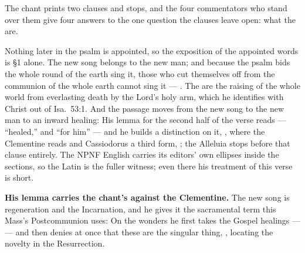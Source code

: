 The chant prints two clauses and stops, and the four commentators who stand over
them give four answers to the one question the clauses leave open: what the
 are.

\begin{witnessnote}
 Nothing later in the psalm
is appointed, so the exposition of the appointed words is \S1 alone. The new
song belongs to the new man; and because the psalm bids the whole round of the
earth sing it, those who cut themselves off from the communion of the whole
earth cannot sing it --- . The  are the raising of the whole world from
everlasting death by the Lord's holy arm, which he identifies with Christ out of
Isa.~53:1. And the passage moves from the new song to the new man to an inward
healing:  His lemma for the second half of the
verse reads  --- ``healed,'' and ``for him'' ---
and he builds a distinction on it, ,
where the Clementine reads  and Cassiodorus a third form,
; the Alleluia stops before that clause entirely. The NPNF
English carries its editors' own ellipses inside the sections, so the Latin is
the fuller witness; even there his treatment of this verse is short.
\end{witnessnote}

\begin{witnessnote}
\textbf{His lemma carries the chant's  against the Clementine.}
The new song is regeneration and the Incarnation, and he gives it the
sacramental term this Mass's Postcommunion uses:  On the wonders he first takes the Gospel healings ---
 ---
and then denies at once that these are the singular thing, , locating the novelty in the Resurrection.
\end{witnessnote}

